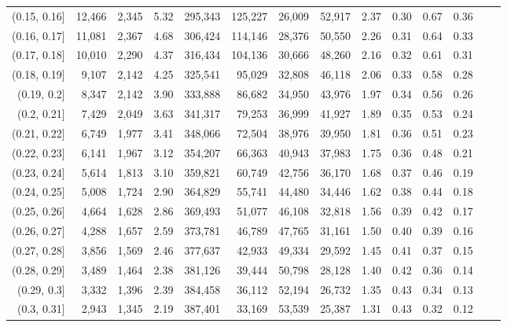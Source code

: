\begin{tabular}{rrrrrrrrrrrrrr}
(0.15, 0.16]   &  12,466 &  2,345 &   5.32 &  295,343 &  125,227 &  26,009 &  52,917 &  2.37 &  0.30 &  0.67 &      0.36 \\
(0.16, 0.17]   &  11,081 &  2,367 &   4.68 &  306,424 &  114,146 &  28,376 &  50,550 &  2.26 &  0.31 &  0.64 &      0.33 \\
(0.17, 0.18]   &  10,010 &  2,290 &   4.37 &  316,434 &  104,136 &  30,666 &  48,260 &  2.16 &  0.32 &  0.61 &      0.31 \\
(0.18, 0.19]   &   9,107 &  2,142 &   4.25 &  325,541 &   95,029 &  32,808 &  46,118 &  2.06 &  0.33 &  0.58 &      0.28 \\
(0.19, 0.2]    &   8,347 &  2,142 &   3.90 &  333,888 &   86,682 &  34,950 &  43,976 &  1.97 &  0.34 &  0.56 &      0.26 \\
(0.2, 0.21]    &   7,429 &  2,049 &   3.63 &  341,317 &   79,253 &  36,999 &  41,927 &  1.89 &  0.35 &  0.53 &      0.24 \\
(0.21, 0.22]   &   6,749 &  1,977 &   3.41 &  348,066 &   72,504 &  38,976 &  39,950 &  1.81 &  0.36 &  0.51 &      0.23 \\
(0.22, 0.23]   &   6,141 &  1,967 &   3.12 &  354,207 &   66,363 &  40,943 &  37,983 &  1.75 &  0.36 &  0.48 &      0.21 \\
(0.23, 0.24]   &   5,614 &  1,813 &   3.10 &  359,821 &   60,749 &  42,756 &  36,170 &  1.68 &  0.37 &  0.46 &      0.19 \\
(0.24, 0.25]   &   5,008 &  1,724 &   2.90 &  364,829 &   55,741 &  44,480 &  34,446 &  1.62 &  0.38 &  0.44 &      0.18 \\
(0.25, 0.26]   &   4,664 &  1,628 &   2.86 &  369,493 &   51,077 &  46,108 &  32,818 &  1.56 &  0.39 &  0.42 &      0.17 \\
(0.26, 0.27]   &   4,288 &  1,657 &   2.59 &  373,781 &   46,789 &  47,765 &  31,161 &  1.50 &  0.40 &  0.39 &      0.16 \\
(0.27, 0.28]   &   3,856 &  1,569 &   2.46 &  377,637 &   42,933 &  49,334 &  29,592 &  1.45 &  0.41 &  0.37 &      0.15 \\
(0.28, 0.29]   &   3,489 &  1,464 &   2.38 &  381,126 &   39,444 &  50,798 &  28,128 &  1.40 &  0.42 &  0.36 &      0.14 \\
(0.29, 0.3]    &   3,332 &  1,396 &   2.39 &  384,458 &   36,112 &  52,194 &  26,732 &  1.35 &  0.43 &  0.34 &      0.13 \\
(0.3, 0.31]    &   2,943 &  1,345 &   2.19 &  387,401 &   33,169 &  53,539 &  25,387 &  1.31 &  0.43 &  0.32 &      0.12 \\

\end{tabular}
